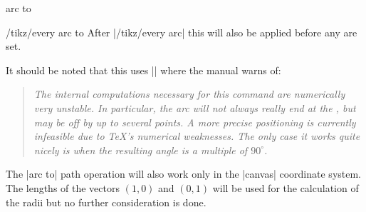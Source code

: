 \begin{pathoperation}{arc to}{}
\begin{stylekey}{/tikz/every arc to}
  After |/tikz/every arc| this will also be applied before any  are set.
\end{stylekey}

It should be noted that this uses |\pgfpatharcto| where the \tikzname\space manual warns of:
\begin{quote}\itshape
    The internal computations necessary for this command are numerically very unstable.
    In particular, the arc will not always really end at the ,
    but may be off by up to several points.
    A more precise positioning is currently infeasible due to \TeX's numerical weaknesses.
    The only case it works quite nicely is when the resulting angle is a multiple of $90^\circ$. 
\end{quote}

The |arc to| path operation will also work only in the |canvas| coordinate system.
The lengths of the vectors $(1, 0)$ and $(0, 1)$ will be used for the calculation of the radii
but no further consideration is done.
\end{pathoperation}